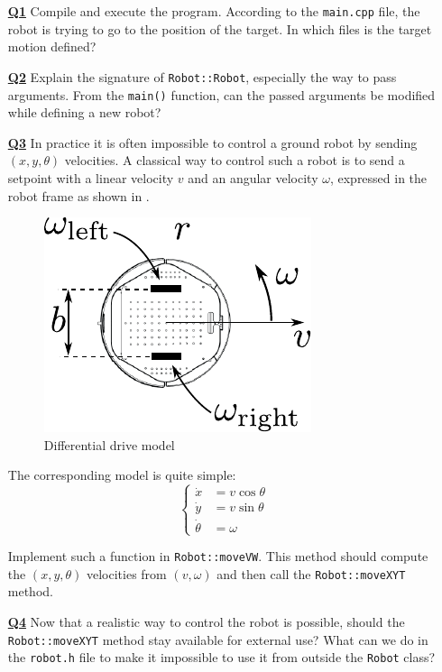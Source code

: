 \documentclass{ecnreport}
\begin{document}
\begin{itemize}
\medskip\item[\textbf{\underline{Q1}}]  Compile and execute the program. According to the \texttt{main.cpp} file, the robot is trying to go to the position of the target. In which files is the target motion defined?

\medskip\item[\textbf{\underline{Q2}}] Explain the signature of   \texttt{Robot::Robot}, especially the way to pass arguments. 
From the \texttt{main()} function, can the passed arguments be modified while defining a new robot?

\medskip\item[\textbf{\underline{Q3}}] In practice it is often impossible to control a ground robot by sending $(x,y,\theta)$ velocities. A classical way to control such a robot is to send a setpoint with a linear velocity $v$ and an angular velocity $\omega$, expressed in the robot frame as shown in .

\begin{figure}[h!]\centering
\includegraphics[width=.3\linewidth]{wheels}
\caption{\label{fig:dd} Differential drive model}
\end{figure}

The corresponding model is quite simple:
\begin{equation*}
\left\{\begin{array}{ll}
\dot x &= v\cos \theta \\
\dot y &= v\sin \theta \\
\dot \theta &= \omega
\end{array}\right.
\end{equation*}

Implement such a function in \texttt{Robot::moveVW}. This method should compute the $(x,y,\theta)$ velocities from $(v,\omega)$ and then call the \texttt{Robot::moveXYT} method. 

\medskip\item[\textbf{\underline{Q4}}] Now that a realistic way to control the robot is possible, should the \texttt{Robot::moveXYT} method stay available for external use? What can we do in the \texttt{robot.h} file to make it impossible to use it from outside the \texttt{Robot} class?


\end{itemize}
\end{document}
